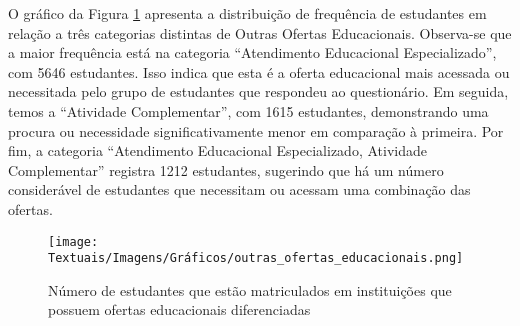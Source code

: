

O gráfico da Figura \ref{fig:outras_ofertas} apresenta a distribuição de frequência de estudantes em relação a três categorias distintas de Outras Ofertas Educacionais. Observa-se que a maior frequência está na categoria ``Atendimento Educacional Especializado'', com 5646 estudantes. Isso indica que esta é a oferta educacional mais acessada ou necessitada pelo grupo de estudantes que respondeu ao questionário. Em seguida, temos a ``Atividade Complementar'', com 1615 estudantes, demonstrando uma procura ou necessidade significativamente menor em comparação à primeira. Por fim, a categoria ``Atendimento Educacional Especializado, Atividade Complementar'' registra 1212 estudantes, sugerindo que há um número considerável de estudantes que necessitam ou acessam uma combinação das ofertas. 

\begin{figure}[ht!]
    \centering
    \caption{Número de estudantes que estão matriculados em instituições que possuem ofertas educacionais diferenciadas}
    \texttt{[image: Textuais/Imagens/Gráficos/outras\_ofertas\_educacionais.png]}
    \label{fig:outras_ofertas}
\end{figure}



